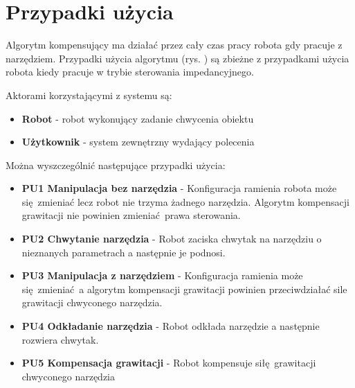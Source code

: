 \section{Przypadki użycia}
Algorytm kompensujący ma działać przez cały czas pracy robota gdy pracuje z narzędziem. Przypadki użycia algorytmu (rys. ) są zbieżne z przypadkami użycia robota kiedy pracuje w trybie sterowania impedancyjnego.

Aktorami korzystającymi z systemu są:
\begin{itemize}
	\item \textbf{Robot} - robot wykonujący zadanie chwycenia obiektu
	\item \textbf{Użytkownik} - system zewnętrzny wydający polecenia
\end{itemize}


Można wyszczególnić następujące przypadki użycia:
\begin{itemize}
	\item \textbf{PU1 Manipulacja bez narzędzia} - Konfiguracja ramienia robota może się zmieniać lecz robot nie trzyma żadnego narzędzia. Algorytm kompensacji grawitacji nie powinien zmieniać prawa sterowania. 
	\item \textbf{PU2 Chwytanie narzędzia} - Robot zaciska chwytak na narzędziu o nieznanych parametrach a następnie je podnosi.  
	\item \textbf{PU3 Manipulacja z narzędziem} - Konfiguracja ramienia może się zmieniać a algorytm kompensacji grawitacji powinien przeciwdziałać sile grawitacji chwyconego narzędzia.
	\item \textbf{PU4 Odkładanie narzędzia} - Robot odkłada narzędzie a następnie rozwiera chwytak.  
	\item \textbf{PU5 Kompensacja grawitacji} - Robot kompensuje siłę grawitacji chwyconego narzędzia
\end{itemize}



